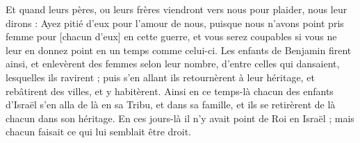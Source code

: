 \begin{multicols}{2}
Et quand leurs pères, ou leurs frères viendront vers nous pour plaider, nous leur dirons : Ayez pitié d'eux pour l'amour de nous, puisque nous n'avons point pris femme pour [chacun d'eux] en cette guerre, et vous serez coupables si vous ne leur en donnez point en un temps comme celui-ci.
Les enfants de Benjamin firent ainsi, et enlevèrent des femmes selon leur nombre, d'entre celles qui dansaient, lesquelles ils ravirent ; puis s'en allant ils retournèrent à leur héritage, et rebâtirent des villes, et y habitèrent.
Ainsi en ce temps-là chacun des enfants d'Israël s'en alla de là en sa Tribu, et dans sa famille, et ils se retirèrent de là chacun dans son héritage.
En ces jours-là il n'y avait point de Roi en Israël ; mais chacun faisait ce qui lui semblait être droit.
\PPE{}
\end{multicols}
